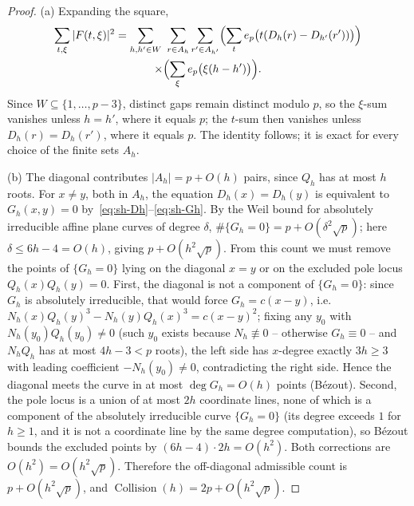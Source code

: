 \begin{proof}
(a) Expanding the square,
\begin{multline*}
 \sum_{t,\xi}|F(t,\xi)|^2
 =\sum_{h,h'\in W}\ \sum_{r\in A_h}\sum_{r'\in A_{h'}}
 \Bigl(\sum_{t}e_p\bigl(t(D_h(r)-D_{h'}(r'))\bigr)\Bigr)\\
 \times\Bigl(\sum_{\xi}e_p\bigl(\xi(h-h')\bigr)\Bigr).
\end{multline*}
Since $W\subseteq\{1,\ldots,p-3\}$, distinct gaps remain distinct modulo
$p$, so the $\xi$-sum vanishes unless $h=h'$, where it equals $p$; the
$t$-sum then vanishes unless $D_h(r)=D_h(r')$, where it equals $p$.  The
identity follows; it is exact for every choice of the finite sets
$A_h$.

(b) The diagonal contributes $|A_h|=p+O(h)$ pairs, since $Q_h$ has at
most $h$ roots.  For $x\ne y$, both in $A_h$, the equation
$D_h(x)=D_h(y)$ is equivalent to $G_h(x,y)=0$
by~\eqref{eq:sh-Dh}--\eqref{eq:sh-Gh}.  By the Weil bound for
absolutely irreducible affine plane curves of degree $\delta$,
$\#\{G_h=0\}=p+O(\delta^2\sqrt p)$; here $\delta\le6h-4=O(h)$, giving
$p+O(h^2\sqrt p)$.
From this count we must remove the points of $\{G_h=0\}$ lying on the
diagonal $x=y$ or on the excluded pole locus $Q_h(x)Q_h(y)=0$.  First,
the diagonal is not a component of $\{G_h=0\}$: since $G_h$ is
absolutely irreducible, that would force $G_h=c(x-y)$, i.e.\
$N_h(x)Q_h(y)^3-N_h(y)Q_h(x)^3=c(x-y)^2$; fixing any $y_0$ with
$N_h(y_0)Q_h(y_0)\ne0$ (such $y_0$ exists because $N_h\not\equiv0$ --
otherwise $G_h\equiv0$ -- and $N_hQ_h$ has at most $4h-3<p$ roots), the
left side has $x$-degree exactly $3h\ge3$ with leading coefficient
$-N_h(y_0)\ne0$, contradicting the right side.  Hence the diagonal
meets the curve in at most $\deg G_h=O(h)$ points (B\'ezout).  Second,
the pole locus is a union of at most $2h$ coordinate lines, none of
which is a component of the absolutely irreducible curve $\{G_h=0\}$
(its degree exceeds $1$ for $h\ge1$, and it is not a coordinate line by
the same degree computation), so B\'ezout bounds the excluded points by
$(6h-4)\cdot2h=O(h^2)$.  Both corrections are $O(h^2)=O(h^2\sqrt p)$.
Therefore the off-diagonal admissible count is $p+O(h^2\sqrt p)$, and
$\operatorname{Collision}(h)=2p+O(h^2\sqrt p)$.
\end{proof}

